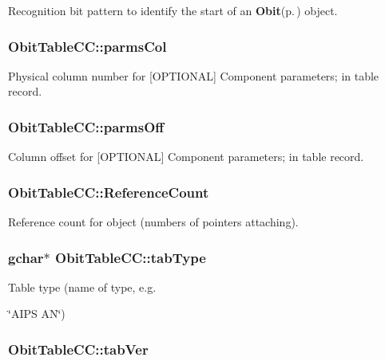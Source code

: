 Recognition bit pattern to identify the start of an {\bf Obit}{\rm (p.\,\pageref{structObit})} object. 

\subsubsection{ {\bf Obit\-Table\-CC::parms\-Col}}\label{structObitTableCC_o23}


Physical column number for [OPTIONAL] Component parameters; in table record. 

\subsubsection{ {\bf Obit\-Table\-CC::parms\-Off}}\label{structObitTableCC_o22}


Column offset for [OPTIONAL] Component parameters; in table record. 

\subsubsection{ {\bf Obit\-Table\-CC::Reference\-Count}}\label{structObitTableCC_o2}


Reference count for object (numbers of pointers attaching). 

\subsubsection{\setlength{\rightskip}{0pt plus 5cm}gchar$\ast$ {\bf Obit\-Table\-CC::tab\-Type}}\label{structObitTableCC_o12}


Table type (name of type, e.g. 

\char`\"{}AIPS AN\char`\"{}) 
\subsubsection{ {\bf Obit\-Table\-CC::tab\-Ver}}\label{structObitTableCC_o13}


